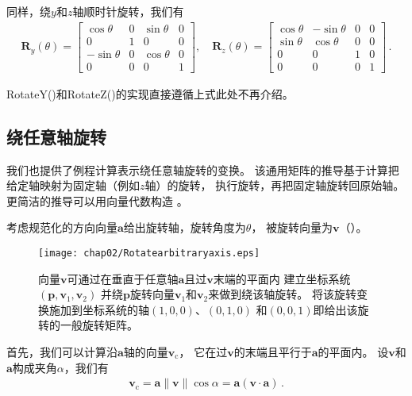 同样，绕$y$和$z$轴顺时针旋转，我们有
\begin{align*}
    \bm R_y(\theta)=\left[
        \begin{array}{cccc}
            \cos\theta  & 0 & \sin\theta & 0 \\
            0           & 1 & 0          & 0 \\
            -\sin\theta & 0 & \cos\theta & 0 \\
            0           & 0 & 0          & 1
        \end{array}
        \right], \quad
    \bm R_z(\theta)=\left[
        \begin{array}{cccc}
            \cos\theta & -\sin\theta & 0 & 0 \\
            \sin\theta & \cos\theta  & 0 & 0 \\
            0          & 0           & 1 & 0 \\
            0          & 0           & 0 & 1
        \end{array}
        \right]\, .
\end{align*}

{\ttfamily RotateY()}和{\ttfamily RotateZ()}的实现直接遵循上式此处不再介绍。

\subsection{绕任意轴旋转}\label{sub:绕任意轴旋转}
我们也提供了例程计算表示绕任意轴旋转的变换。
该通用矩阵的推导基于计算把给定轴映射为固定轴（例如$z$轴）的旋转，
执行旋转，再把固定轴旋转回原始轴。
更简洁的推导可以用向量代数构造
。

考虑规范化的方向向量$\bm a$给出旋转轴，旋转角度为$\theta$，
被旋转向量为$\bm v$（）。
\begin{figure}[htbp]
    \centering\texttt{[image: chap02/Rotatearbitraryaxis.eps]}
    \caption{向量$\bm v$可通过在垂直于任意轴$\bm a$且过$\bm v$末端的平面内
        建立坐标系统$(\bm p,\bm v_1,\bm v_2)$
        并绕$\bm p$旋转向量$\bm v_1$和$\bm v_2$来做到绕该轴旋转。
        将该旋转变换施加到坐标系统的轴$(1,0,0)$、$(0,1,0)$
        和$(0,0,1)$即给出该旋转的一般旋转矩阵。}
    \label{fig:2.12}
\end{figure}

首先，我们可以计算沿$\bm a$轴的向量$\bm v_\mathrm{c}$，
它在过$\bm v$的末端且平行于$\bm a$的平面内。
设$\bm v$和$\bm a$构成夹角$\alpha$，我们有
\begin{align*}
    \bm v_\mathrm{c}=\bm a\|\bm v\|\cos\alpha=\bm a(\bm v\cdot\bm a)\, .
\end{align*}

